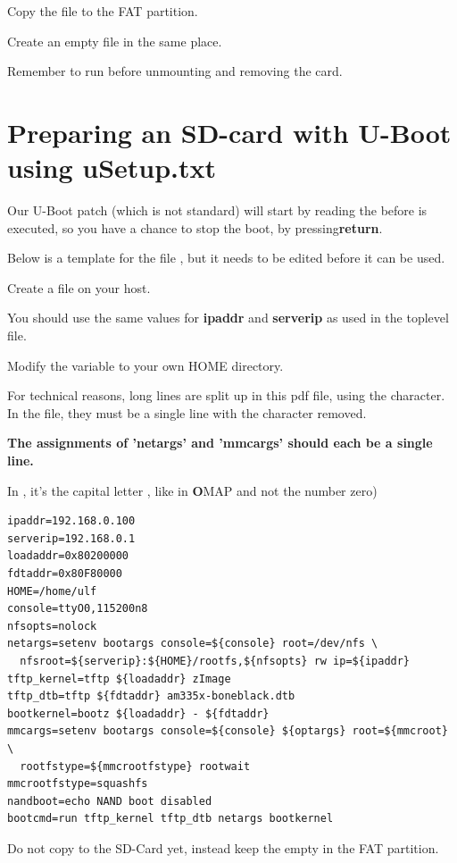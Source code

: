 Copy the file to the FAT partition.

Create an empty file  in the same place. 

Remember to run  before unmounting and removing the card.

\clearpage
\section{Preparing an SD-card with U-Boot using uSetup.txt}

Our U-Boot patch (which is not standard) will start by reading the 
before  is executed, so you have a chance to stop the boot,
by pressing{\bf return}.

Below is a template for the file , but it needs to be edited
before it can be used. 

Create a  file on your host.

You should use the same values for {\bf ipaddr} and {\bf serverip} as used in the toplevel  file.

Modify the  variable to your own HOME directory.

For technical reasons, long lines are split up in this pdf file, 
using the {\bf {}} character.
In the  file, they must be a single line with the {\bf {}} character removed.

{\bf The assignments of 'netargs' and 'mmcargs' should each be a single line.}

In , it's the capital letter , like in {\bf O}MAP and not the number zero)

\begin{verbatim}
ipaddr=192.168.0.100
serverip=192.168.0.1
loadaddr=0x80200000
fdtaddr=0x80F80000
HOME=/home/ulf
console=ttyO0,115200n8
nfsopts=nolock
netargs=setenv bootargs console=${console} root=/dev/nfs \
  nfsroot=${serverip}:${HOME}/rootfs,${nfsopts} rw ip=${ipaddr}
tftp_kernel=tftp ${loadaddr} zImage
tftp_dtb=tftp ${fdtaddr} am335x-boneblack.dtb
bootkernel=bootz ${loadaddr} - ${fdtaddr}
mmcargs=setenv bootargs console=${console} ${optargs} root=${mmcroot} \
  rootfstype=${mmcrootfstype} rootwait
mmcrootfstype=squashfs
nandboot=echo NAND boot disabled
bootcmd=run tftp_kernel tftp_dtb netargs bootkernel
\end{verbatim}

Do not copy  to the SD-Card yet, instead keep the empty 
 in the FAT partition.

